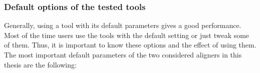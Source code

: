 \documentclass[11pt,a4paper]{report}
\begin{document}

\subsubsection{Default options of the tested tools} \label{Default options of the tested tools}

Generally, using a tool with its default parameters gives a good performance. Most of the time users use the tools with the default setting or just tweak some of them. Thus, it is important to know these
options and the effect of using them.  
The most important default parameters of the two considered aligners in this thesis are the following:
\end{document}
